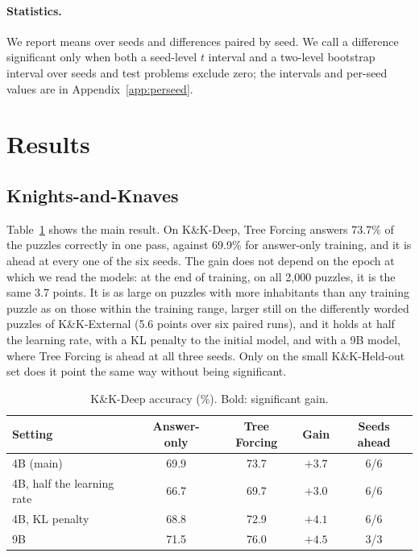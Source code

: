 \documentclass[10pt]{article}
\newcommand{\tf}{Tree Forcing}
\begin{document}
\paragraph{Statistics.} We report means over seeds and differences paired by seed. We call a difference significant
only when both a seed-level $t$ interval and a two-level bootstrap interval over seeds and test problems exclude zero;
the intervals and per-seed values are in Appendix~\ref{app:perseed}.

\section{Results}
\label{sec:results}

\subsection{Knights-and-Knaves}
\label{sec:kk}

Table~\ref{tab:kk} shows the main result. On K\&K-Deep, \tf{} answers 73.7\% of the puzzles correctly in one pass, against
69.9\% for answer-only training, and it is ahead at every one of the six seeds. The gain does not depend on the
epoch at which we read the models: at the end of training, on all 2,000 puzzles, it is the same 3.7 points. It is as
large on puzzles with more inhabitants than any training puzzle as on those within the training range, larger still on
the differently worded puzzles of K\&K-External (5.6 points over six paired runs), and it holds at half the learning
rate, with a KL penalty to the initial model, and with a 9B model, where \tf{} is ahead at all three seeds. Only on the
small K\&K-Held-out set does it point the same way without being significant.

\begin{table}[t]
\centering
\small
\caption{K\&K-Deep accuracy (\%). Bold: significant gain.}
\label{tab:kk}
\begin{tabular}{lcccc}
\toprule
Setting & Answer-only & \tf{} & Gain & Seeds ahead \\
\midrule
4B (main) & 69.9 & 73.7 & $\mathbf{+3.7}$ & 6/6 \\
4B, half the learning rate & 66.7 & 69.7 & $\mathbf{+3.0}$ & 6/6 \\
4B, KL penalty & 68.8 & 72.9 & $\mathbf{+4.1}$ & 6/6 \\
9B & 71.5 & 76.0 & $\mathbf{+4.5}$ & 3/3 \\
\bottomrule
\end{tabular}
\end{table}
\end{document}

